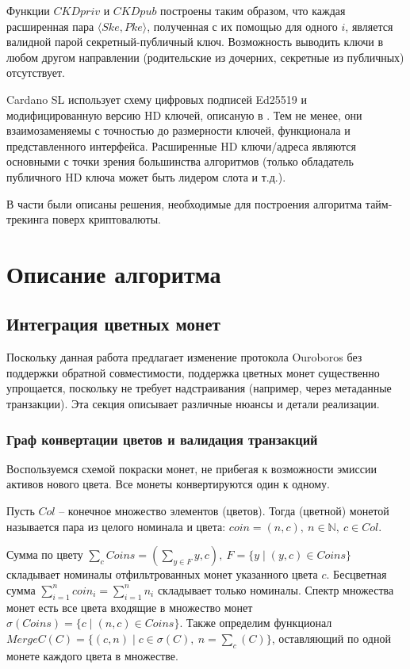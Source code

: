 \documentclass[specification,annotation]{itmo-student-thesis}
\begin{document}
Функции $CKDpriv$ и $CKDpub$ построены таким образом, что каждая
расширенная пара $\langle Ske,Pke \rangle$, полученная с их помощью
для одного $i$, является валидной парой секретный-публичный
ключ. Возможность выводить ключи в любом другом направлении
(родительские из дочерних, секретные из публичных) отсутствует.

Cardano SL использует схему цифровых подписей Ed25519
\cite{bernstein2012high} и модифицированную версию HD ключей, описаную
в \cite{ed25519hd}. Тем не менее, они взаимозаменяемы с точностью до
размерности ключей, функционала и представленного
интерфейса. Расширенные HD ключи/адреса являются основными с точки
зрения большинства алгоритмов (только обладатель публичного HD ключа
может быть лидером слота и т.д.).

\chapterconclusion

В части были описаны решения, необходимые для построения алгоритма
тайм-трекинга поверх криптовалюты.

\chapter{Описание алгоритма}

\section{Интеграция цветных монет}

Поскольку данная работа предлагает изменение протокола Ouroboros без
поддержки обратной совместимости, поддержка цветных монет существенно
упрощается, поскольку не требует надстраивания (например, через
метаданные транзакции). Эта секция описывает различные нюансы и детали
реализации.

\subsection{Граф конвертации цветов и валидация транзакций}

Воспользуемся схемой покраски монет, не прибегая к возможности эмиссии
активов нового цвета. Все монеты конвертируются один к
одному.

\begin{definition}
Пусть $Col$ -- конечное множество элементов (цветов). Тогда (цветной)
монетой называется пара из целого номинала и цвета: $coin = (n,c), \ n
\in \mathbb{N}, \ c \in Col$.
\end{definition}

Сумма по цвету $\sum_c{Coins} = (\sum_{y \in F}{y}, c), \ F = \{y \mid
(y,c) \in Coins\}$ складывает номиналы отфильтрованных монет
указанного цвета $c$. Бесцветная сумма $\sum_{i=1}^n{coin_i} =
\sum_{i=1}^n{n_i}$ складывает только номиналы. Спектр множества монет
есть все цвета входящие в множество монет $\sigma(Coins) = \{c \mid
(n,c) \in Coins\}$. Также определим функционал $MergeC(C) = \{(c,n)
\mid c \in \sigma(C), \ n = \sum_c(C)\}$, оставляющий по одной монете
каждого цвета в множестве.
\end{document}

